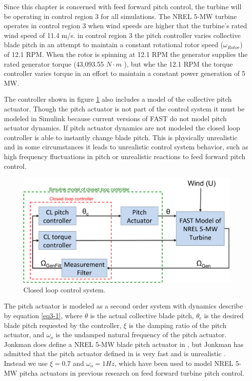 Since this chapter is concerned with feed forward pitch control, the turbine will be operating in control region 3 for all simulations. The NREL 5-MW turbine operates in control region 3 when wind speeds are higher that the turbine's rated wind speed of 11.4 m/s. in control region 3 the pitch controller varies collective blade pitch in an attempt to maintain a constant rotational rotor speed ($\omega_{Rotor}$) of 12.1 RPM. When the rotor is spinning at 12.1 RPM the generator supplies the rated generator torque (43,093.55 $N \cdot m$ ), but whe the 12.1 RPM the torque controller varies torque in an effort to maintain a constant power generation of 5 MW. 

The controller shown in figure \ref{fig3-9} also includes a model of the collective pitch actuator. Though the pitch actuator is not part of the control system it must be modeled in Simulink because current versions of FAST do not model pitch actuator dynamics. If pitch actuator dynamics are not modeled the closed loop controller is able to instantly change blade pitch. This is physically unrealistic and in some circumstances it leads to unrealistic control system behavior, such as high frequency fluctuations in pitch or unrealistic reactions to feed forward pitch control.

 \begin{figure}[htbp]
	\centering
		\includegraphics[width=\linewidth]{Figures/ch3Figures/fig3-9.png}
		
	\caption{Closed loop control system.}
	\label{fig3-9}
\end{figure}

The pitch actuator is modeled as a second order system with dynamics describe by equation \ref{eq3-1}, where  $\theta$  is the actual collective blade pitch, $\theta_c$ is the desired blade pitch requested by the controller, $\xi$ is the damping ratio of the pitch actuator, and $\omega_o$ is the undamped natural frequency of the pitch actuator. Jonkman does define a NREL 5-MW blade pitch actuator in \cite{jonkman2009}, but Jonkman has admitted that the pitch actuator defined in \cite{jonkman2009} is very fast and is unrealistic \cite{jonkman2014}. Instead we use $\xi = 0.7$ and $\omega_o = 1Hz$, which have been used to model NREL 5-MW pitcha actuators in previous research on feed forward turbine pitch control\cite{dunne2011,dunne2012}. 


